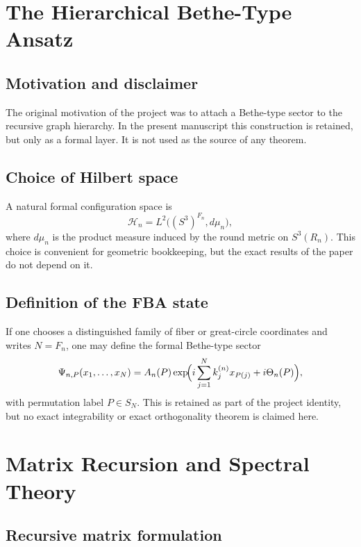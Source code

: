 \documentclass[
  aps,
  prd,
  reprint,
  superscriptaddress,
  nofootinbib,
  longbibliography,
  amsmath,
  amssymb
]{revtex4-2}
\theoremstyle{remark}
\newcommand{\Sthree}{S^{3}}
\begin{document}
\section{The Hierarchical Bethe-Type Ansatz}
\label{sec:bethe}

\subsection{Motivation and disclaimer}

The original motivation of the project was to attach a Bethe-type sector to the recursive graph hierarchy. In the present manuscript this construction is retained, but only as a formal layer. It is not used as the source of any theorem.

\subsection{Choice of Hilbert space}

A natural formal configuration space is
\begin{equation}
\mathcal H_n=L^2\bigl((\Sthree)^{F_n},d\mu_n\bigr),
\label{eq:hilbert}
\end{equation}
where $d\mu_n$ is the product measure induced by the round metric on $\Sthree(R_n)$. This choice is convenient for geometric bookkeeping, but the exact results of the paper do not depend on it.

\subsection{Definition of the FBA state}

If one chooses a distinguished family of fiber or great-circle coordinates and writes $N=F_n$, one may define the formal Bethe-type sector
\begin{equation}
\Psi_{n,P}(x_1,\dots,x_N)
=
A_n(P)
\exp\!\Bigl(i\sum_{j=1}^{N}k_j^{(n)}x_{P(j)}+i\Theta_n(P)\Bigr),
\label{eq:betheformal}
\end{equation}
with permutation label $P\in S_N$. This is retained as part of the project identity, but no exact integrability or exact orthogonality theorem is claimed here.

\section{Matrix Recursion and Spectral Theory}
\label{sec:matrix}

\subsection{Recursive matrix formulation}
\end{document}

